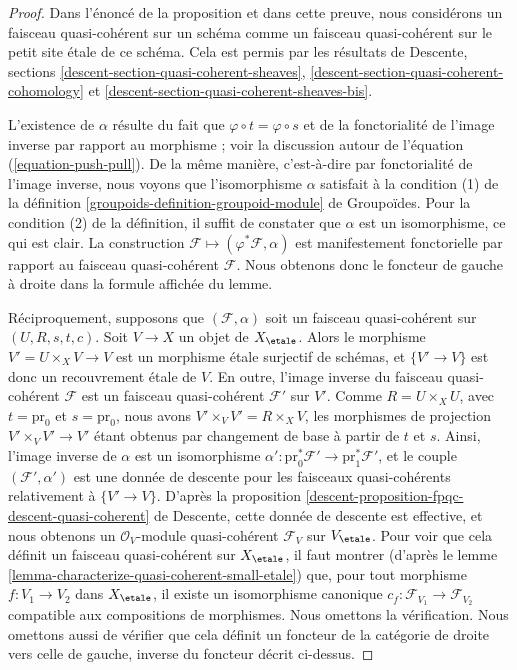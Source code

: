 \begin{proof}
Dans l'énoncé de la proposition et dans cette preuve, nous considérons un
faisceau quasi-cohérent sur un schéma comme un faisceau quasi-cohérent sur le petit
site \'etale de ce schéma. Cela est permis par les résultats de
Descente, sections \ref{descent-section-quasi-coherent-sheaves},
\ref{descent-section-quasi-coherent-cohomology} et
\ref{descent-section-quasi-coherent-sheaves-bis}.

\medskip\noindent
L'existence de $\alpha$ résulte du fait que
$\varphi \circ t = \varphi \circ s$ et de la fonctorialité de l'image inverse
par rapport au morphisme ; voir la discussion autour de
l'équation (\ref{equation-push-pull}). De la même manière, c'est-à-dire par
fonctorialité de l'image inverse, nous voyons que l'isomorphisme $\alpha$ satisfait
à la condition (1) de la
définition \ref{groupoids-definition-groupoid-module} de Groupoïdes.
Pour la condition (2) de la définition, il suffit de constater que $\alpha$
est un isomorphisme, ce qui est clair. La construction
$\mathcal{F} \mapsto (\varphi^*\mathcal{F}, \alpha)$
est manifestement fonctorielle par rapport au faisceau quasi-cohérent $\mathcal{F}$.
Nous obtenons donc le foncteur de gauche à droite dans la formule
affichée du lemme.

\medskip\noindent
Réciproquement, supposons que $(\mathcal{F}, \alpha)$ soit un faisceau
quasi-cohérent sur $(U, R, s, t, c)$. Soit $V \to X$ un objet de $X_\etale$.
Alors le morphisme $V' = U \times_X V \to V$ est un morphisme \'etale
surjectif de schémas, et $\{V' \to V\}$ est donc un recouvrement \'etale
de $V$. En outre, l'image inverse du faisceau quasi-cohérent $\mathcal{F}$
est un faisceau quasi-cohérent $\mathcal{F}'$ sur $V'$.
Comme $R = U \times_X U$, avec $t = \text{pr}_0$ et $s = \text{pr}_0$,
nous avons $V' \times_V V' = R \times_X V$, les morphismes de projection
$V' \times_V V' \to V'$ étant obtenus par changement de base à partir de $t$ et $s$. Ainsi,
l'image inverse de $\alpha$ est un isomorphisme
$\alpha' : \text{pr}_0^*\mathcal{F}' \to \text{pr}_1^*\mathcal{F}'$, et
le couple $(\mathcal{F}', \alpha')$ est une donnée de descente pour les faisceaux
quasi-cohérents relativement à $\{V' \to V\}$. D'après la
proposition
\ref{descent-proposition-fpqc-descent-quasi-coherent} de Descente,
cette donnée de descente est effective, et nous obtenons un
$\mathcal{O}_V$-module quasi-cohérent $\mathcal{F}_V$ sur $V_\etale$.
Pour voir que cela définit un faisceau quasi-cohérent sur $X_\etale$, il faut
montrer (d'après le
lemme \ref{lemma-characterize-quasi-coherent-small-etale})
que, pour tout morphisme $f : V_1 \to V_2$ dans $X_\etale$,
il existe un isomorphisme canonique
$c_f : \mathcal{F}_{V_1} \to \mathcal{F}_{V_2}$
compatible aux compositions de morphismes. Nous omettons la vérification.
Nous omettons aussi de vérifier que cela définit un foncteur de la
catégorie de droite vers celle de gauche, inverse
du foncteur décrit ci-dessus.
\end{proof}

